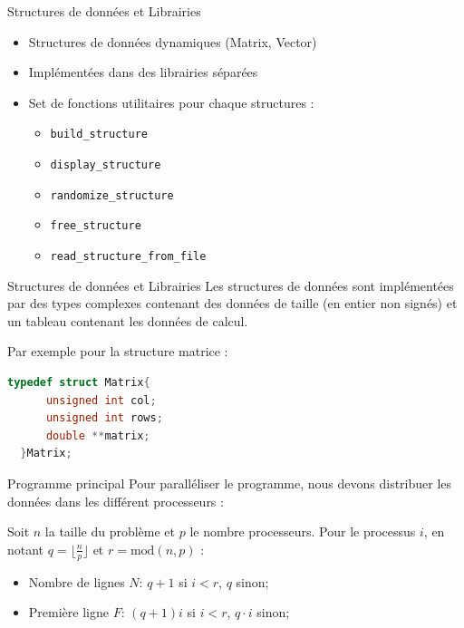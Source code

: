 \documentclass{beamer}
\begin{document}
\begin{frame}{Structures de données et Librairies}
  \begin{itemize}
    \item Structures de données dynamiques (Matrix, Vector)
    \item Implémentées dans des librairies séparées
    \item Set de fonctions utilitaires pour chaque structures :
    \begin{itemize}
      \item \texttt{build\_structure} 
      \item \texttt{display\_structure}
      \item \texttt{randomize\_structure}
      \item \texttt{free\_structure}
      \item \texttt{read\_structure\_from\_file}
    \end{itemize}
  \end{itemize}
\end{frame}

\begin{frame}[fragile]{Structures de données et Librairies}
  Les structures de données sont implémentées par des types complexes contenant des données de taille (en entier non signés) et un tableau contenant les données de calcul.

  Par exemple pour la structure matrice :
  \begin{lstlisting}[language=C]
  typedef struct Matrix{
      unsigned int col;
      unsigned int rows;
      double **matrix; 
  }Matrix;
  \end{lstlisting}
\end{frame}

\begin{frame}{Programme principal}
Pour paralléliser le programme, nous devons distribuer les données dans les différent processeurs :

Soit \(n\) la taille du problème et \(p\) le nombre processeurs.
Pour le processus \(i\), en notant \(q = \lfloor \frac{n}{p} \rfloor\) et \(r = \text{mod}(n,p)\) :
\begin{itemize}
    \item Nombre de lignes \(N\):  \(q+1\) si \(i<r\), \(q\) sinon;
    \item Première ligne \(F\):  \((q+1)i\) si \(i<r\), \(q\cdot i\) sinon;
\end{itemize}
\end{frame}
\end{document}
